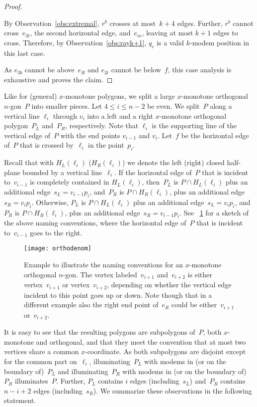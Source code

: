 \documentclass[A4]{article}
\begin{document}
\begin{proof}
\begin{enumerate}
By Observation~\ref{obs:extremal}, $r^b$ crosses at most~$k+4$ edges.
Further, $r^b$ cannot cross~$e_{3t}$, the second horizontal edge, and~$e_m$, leaving at most $k+1$ edges to cross.
Therefore, by Observation~\ref{obs:rayk+1}, $q_r$ is a valid \mbox{$k$-modem} position in this last case.
\end{enumerate}

As $e_{3b}$ cannot be above~$e_R$ and $e_{3t}$ cannot be below~$f$, this case analysis is exhaustive and proves the claim.
\end{proof}


Like for (general) $x$-monotone polygons, we split a large $x$-monotone orthogonal $n$-gon~$P$ into smaller pieces.
Let $4\leq i\leq n-2$ be even.
We split~$P$ along a vertical line $\ell_i$ through $v_i$ into a left and a right $x$-monotone orthogonal polygon~$P_L$ and~$P_R$, respectively.
Note that $\ell_i$ is the supporting line of the vertical edge of~$P$ with the end points $v_{i-1}$ and $v_i$.
Let~$f$ be the horizontal edge of~$P$ that is crossed by~$\ell_i$ in the point~$p_i$.


Recall that with $H_L(\ell_i)$ ($H_R(\ell_i)$) we denote the left (right) closed half-plane bounded by a vertical line~$\ell_i$.
If the horizontal edge of~$P$ that is incident to~$v_{i-1}$ is completely contained in $H_L(\ell_i)$, then~$P_L$ is $P\cap H_L(\ell_i)$ plus an additional edge~$s_L=v_{i-1}p_i$, and~$P_R$ is $P\cap H_R(\ell_i)$, plus an additional edge~$s_R=v_{i}p_i$.
Otherwise, $P_L$ is $P\cap H_L(\ell_i)$ plus an additional edge~$s_L=v_{i}p_i$, and~$P_R$ is $P\cap H_R(\ell_i)$, plus an additional edge~$s_R=v_{i-1}p_i$.
See \figurename~\ref{fig:orthonaming} for a sketch of the above naming conventions, where the horizontal edge of~$P$ that is incident to~$v_{i-1}$ goes to the right. 

\begin{figure}[htb]
  \centering
  \texttt{[image: orthodenom]}
  \caption{Example to illustrate the naming conventions for an $x$-monotone orthogonal $n$-gon.
    The vertex labeled~$v_{i+1}$ and~$v_{i+2}$ is either vertex~$v_{i+1}$ or vertex~$v_{i+2}$, depending on whether the vertical edge incident to this point goes up or down.
    Note though that in a different example also the right end point of~$e_R$ could be either~$v_{i+1}$ or~$v_{i+2}$.}
  \label{fig:orthonaming}
\end{figure}

It is easy to see that the resulting polygons are subpolygons of~$P$, both $x$-monotone and orthogonal, and that they meet the convention that at most two vertices share a common $x$-coordinate.
As both subpolygons are disjoint except for the common part on~$\ell_i$, illuminating~$P_L$ with modems in (or on the boundary of)~$P_L$ and illuminating~$P_R$ with  modems in (or on the boundary of)~$P_R$ illuminates~$P$.
Further, $P_L$ contains $i$ edges (including~$s_L$) and~$P_R$ contains $n-i+2$ edges (including~$s_R$).
We summarize these observations in the following statement.
\end{document}
